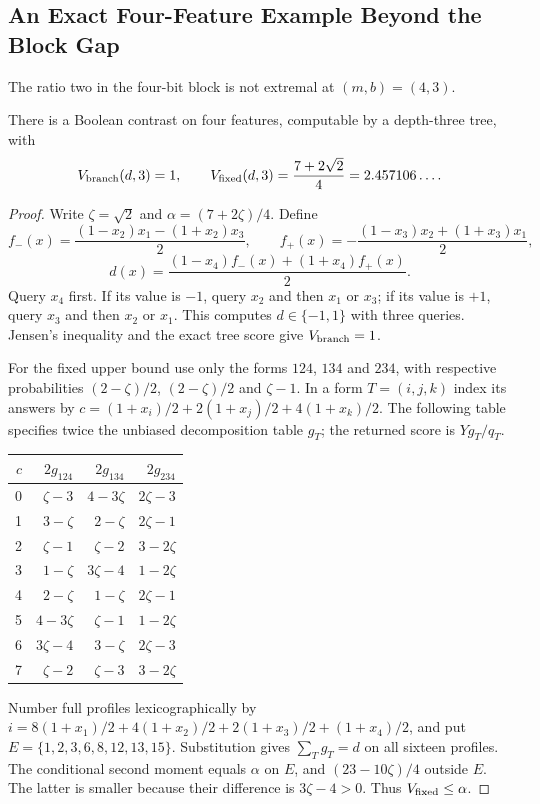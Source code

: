 \subsection{An Exact Four-Feature Example Beyond the Block Gap}\label{app:fourbit}
The ratio two in the four-bit block is not extremal at $(m,b)=(4,3)$.
\begin{proposition}\label{prop:fourbit}
There is a Boolean contrast on four features, computable by a depth-three tree, with
\[
 V_{\rm branch}(d,3)=1,\qquad
 V_{\rm fixed}(d,3)=\frac{7+2\sqrt2}{4}=2.457106\ldots.
\]
\end{proposition}
\begin{proof}
Write $\zeta=\sqrt2$ and $\alpha=(7+2\zeta)/4$. Define
\[
 f_-(x)=\frac{(1-x_2)x_1-(1+x_2)x_3}{2},\qquad
 f_+(x)=-\frac{(1-x_3)x_2+(1+x_3)x_1}{2},
\]
\[
 d(x)=\frac{(1-x_4)f_-(x)+(1+x_4)f_+(x)}2.
\]
Query $x_4$ first. If its value is $-1$, query $x_2$ and then $x_1$ or $x_3$; if its value is $+1$, query $x_3$ and then $x_2$ or $x_1$. This computes $d\in\{-1,1\}$ with three queries. Jensen's inequality and the exact tree score give $V_{\rm branch}=1$.

For the fixed upper bound use only the forms $124$, $134$ and $234$, with respective probabilities $(2-\zeta)/2$, $(2-\zeta)/2$ and $\zeta-1$. In a form $T=(i,j,k)$ index its answers by $c=(1+x_i)/2+2(1+x_j)/2+4(1+x_k)/2$. The following table specifies twice the unbiased decomposition table $g_T$; the returned score is $Yg_T/q_T$.
\begin{center}
\begin{tabular}{rrrr}
\toprule
$c$ & $2g_{124}$ & $2g_{134}$ & $2g_{234}$\\
\midrule
0 & $\zeta-3$ & $4-3\zeta$ & $2\zeta-3$\\
1 & $3-\zeta$ & $2-\zeta$ & $2\zeta-1$\\
2 & $\zeta-1$ & $\zeta-2$ & $3-2\zeta$\\
3 & $1-\zeta$ & $3\zeta-4$ & $1-2\zeta$\\
4 & $2-\zeta$ & $1-\zeta$ & $2\zeta-1$\\
5 & $4-3\zeta$ & $\zeta-1$ & $1-2\zeta$\\
6 & $3\zeta-4$ & $3-\zeta$ & $2\zeta-3$\\
7 & $\zeta-2$ & $\zeta-3$ & $3-2\zeta$\\
\bottomrule
\end{tabular}
\end{center}
Number full profiles lexicographically by $i=8(1+x_1)/2+4(1+x_2)/2+2(1+x_3)/2+(1+x_4)/2$, and put $E=\{1,2,3,6,8,12,13,15\}$. Substitution gives $\sum_Tg_T=d$ on all sixteen profiles. The conditional second moment equals $\alpha$ on $E$, and $(23-10\zeta)/4$ outside $E$. The latter is smaller because their difference is $3\zeta-4>0$. Thus $V_{\rm fixed}\le\alpha$.


\end{proof}
